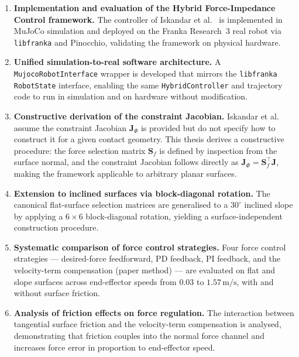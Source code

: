 \documentclass[
	german,%
	accentcolor=9c,%
	ruledheaders=section,%
	class=report,%
	thesis={type=bachelor},%
	fontsize=11pt,%
	parskip=half-,%
	custommargins=true,%
	marginpar=false,%
]{tudapub}
\begin{document}
\begin{enumerate}

    \item \textbf{Implementation and evaluation of the Hybrid Force-Impedance
          Control framework.}
          The controller of Iskandar et al.~\cite{iskandar2023} is implemented
          in MuJoCo simulation and deployed on the Franka Research~3 real robot
          via \texttt{libfranka} and Pinocchio, validating the framework on
          physical hardware.

    \item \textbf{Unified simulation-to-real software architecture.}
          A \texttt{MujocoRobotInterface} wrapper is developed that mirrors the
          \texttt{libfranka} \texttt{RobotState} interface, enabling the same
          \texttt{HybridController} and trajectory code to run in simulation and
          on hardware without modification.

    \item \textbf{Constructive derivation of the constraint Jacobian.}
          Iskandar et al.~\cite{iskandar2023} assume the constraint Jacobian
          $\mathbf{J}_\Phi$ is provided but do not specify how to construct
          it for a given contact geometry.
          This thesis derives a constructive procedure: the force selection
          matrix $\mathbf{S}_f$ is defined by inspection from the surface
          normal, and the constraint Jacobian follows directly as
          $\mathbf{J}_\Phi = \mathbf{S}_f^\top \mathbf{J}$, making the
          framework applicable to arbitrary planar surfaces.

    \item \textbf{Extension to inclined surfaces via block-diagonal rotation.}
          The canonical flat-surface selection matrices are generalised to a
          $30^\circ$ inclined slope by applying a $6\times6$ block-diagonal
          rotation, yielding a surface-independent construction procedure.

    \item \textbf{Systematic comparison of force control strategies.}
          Four force control strategies — desired-force feedforward,
          PD feedback, PI feedback, and the velocity-term compensation
          (paper method) — are evaluated on flat and slope surfaces across
          end-effector speeds from $0.03$ to $1.57\,\mathrm{m/s}$, with and
          without surface friction.

    \item \textbf{Analysis of friction effects on force regulation.}
          The interaction between tangential surface friction and the
          velocity-term compensation is analysed, demonstrating that friction
          couples into the normal force channel and increases force error in
          proportion to end-effector speed.


\end{enumerate}
\end{document}
